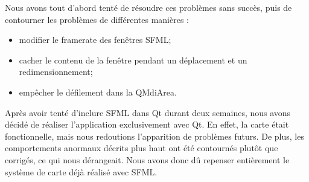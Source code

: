 Nous avons tout d'abord tenté de résoudre ces problèmes sans succès, puis de contourner les problèmes de différentes manières :
\begin{itemize}
	\item modifier le framerate des fenêtres SFML;
	\item cacher le contenu de la fenêtre pendant un déplacement et un redimensionnement;
	\item empêcher le défilement dans la QMdiArea.
\end{itemize}
 
Après avoir tenté d'inclure SFML dans Qt durant deux semaines, nous avons décidé de réaliser l'application exclusivement avec Qt. En effet, la carte était fonctionnelle, mais nous redoutions l'apparition de problèmes futurs. De plus, les comportements anormaux décrits plus haut ont été contournés plutôt que corrigés, ce qui nous dérangeait. Nous avons donc dû repenser entièrement le système de carte déjà réalisé avec SFML.